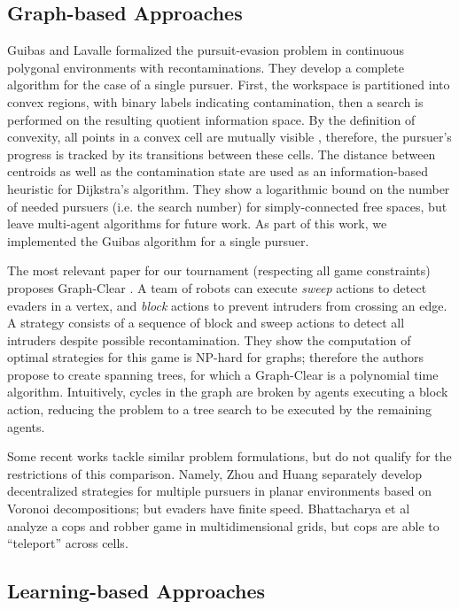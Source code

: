 \documentclass[conference]{IEEEtran}
\begin{document}
\subsection{Graph-based Approaches}

Guibas and Lavalle \cite{guibas1999visibility} formalized the pursuit-evasion problem in continuous polygonal environments with recontaminations. They develop a complete algorithm for the case of a single pursuer. First, the workspace is partitioned into convex regions, with binary labels indicating contamination, then a search is performed on the resulting quotient information space. By the definition of convexity, all points in a convex cell are mutually visible \cite{boyd2004convex}, therefore, the pursuer's progress is tracked by its transitions between these cells. The distance between centroids as well as the contamination state are used as an information-based heuristic for Dijkstra's algorithm. They show a logarithmic bound on the number of needed pursuers (i.e. the search number) for simply-connected free spaces, but leave multi-agent algorithms for future work. As part of this work, we implemented the Guibas algorithm for a single pursuer.

The most relevant paper for our tournament (respecting all game constraints) proposes Graph-Clear \cite{kolling2009pursuit}. A team of robots can execute \textit{sweep} actions to detect evaders in a vertex, and \textit{block} actions to prevent intruders from crossing an edge. A strategy consists of a sequence of block and sweep actions to detect all intruders despite possible recontamination. They show the computation of optimal strategies for this game is NP-hard for graphs; therefore the authors propose to create spanning trees, for which a Graph-Clear is a polynomial time algorithm. Intuitively, cycles in the graph are broken by agents executing a block action, reducing the problem to a tree search to be executed by the remaining agents.

Some recent works tackle similar problem formulations, but do not qualify for the restrictions of this comparison. Namely, Zhou \cite{zhou2016cooperative} and Huang \cite{huang2011guaranteed} separately develop decentralized strategies for multiple pursuers in planar environments based on Voronoi decompositions; but evaders have finite speed. Bhattacharya et al \cite{BHATTACHARYA20101745} analyze a cops and robber game in multidimensional grids, but cops are able to ``teleport'' across cells.

\subsection{Learning-based Approaches}
\end{document}
